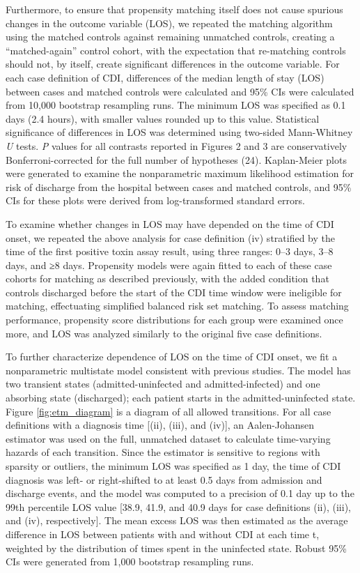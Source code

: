Furthermore, to ensure that propensity matching itself does not cause spurious changes in the outcome variable (LOS), we repeated the matching algorithm using the matched controls against remaining unmatched controls, creating a “matched-again” control cohort, with the expectation that re-matching controls should not, by itself, create significant differences in the outcome variable. For each case definition of CDI, differences of the median length of stay (LOS) between cases and matched controls were calculated and 95\% CIs were calculated from 10,000 bootstrap resampling runs. The minimum LOS was specified as 0.1 days (2.4 hours), with smaller values rounded up to this value. Statistical significance of differences in LOS was determined using two-sided Mann-Whitney \emph{U} tests. \emph{P} values for all contrasts reported in Figures 2 and 3 are conservatively Bonferroni-corrected for the full number of hypotheses (24). Kaplan-Meier plots were generated to examine the nonparametric maximum likelihood estimation for risk of discharge from the hospital between cases and matched controls, and 95\% CIs for these plots were derived from log-transformed standard errors.

To examine whether changes in LOS may have depended on the time of CDI onset, we repeated the above analysis for case definition (iv) stratified by the time of the first positive toxin assay result, using three ranges: 0–3 days, 3–8 days, and ≥8 days. Propensity models were again fitted to each of these case cohorts for matching as described previously, with the added condition that controls discharged before the start of the CDI time window were ineligible for matching, effectuating simplified balanced risk set matching.\autocite{Li2001} To assess matching performance, propensity score distributions for each group were examined once more, and LOS was analyzed similarly to the original five case definitions.

To further characterize dependence of LOS on the time of CDI onset, we fit a nonparametric multistate model consistent with previous studies.\autocite{Mitchell2014,Stevens2015,VanKleef2014} The model has two transient states (admitted-uninfected and admitted-infected) and one absorbing state (discharged); each patient starts in the admitted-uninfected state. Figure \ref{fig:etm_diagram} is a diagram of all allowed transitions. For all case definitions with a diagnosis time [(ii), (iii), and (iv)], an Aalen-Johansen estimator was used on the full, unmatched dataset to calculate time-varying hazards of each transition. Since the estimator is sensitive to regions with sparsity or outliers, the minimum LOS was specified as 1 day, the time of CDI diagnosis was left- or right-shifted to at least 0.5 days from admission and discharge events, and the model was computed to a precision of 0.1 day up to the 99th percentile LOS value [38.9, 41.9, and 40.9 days for case definitions (ii), (iii), and (iv), respectively]. The mean excess LOS was then estimated as the average difference in LOS between patients with and without CDI at each time t, weighted by the distribution of times spent in the uninfected state. Robust 95\% CIs were generated from 1,000 bootstrap resampling runs.

